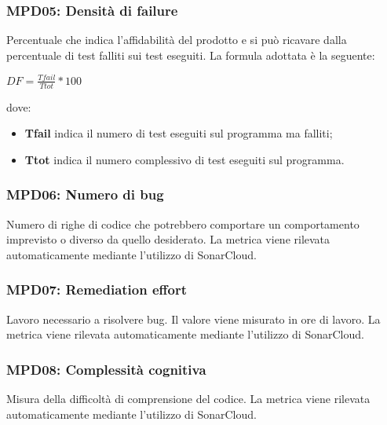 \subsubsection{MPD05: Densità di failure}
Percentuale che indica l'affidabilità del prodotto e si può ricavare dalla percentuale di test falliti sui test eseguiti.
La formula adottata è la seguente:
\begin{center}
    $DF = \displaystyle \frac{Tfail}{Ttot}*100$
\end{center}
dove:
\begin{itemize}
    \item \textbf{Tfail} indica il numero di test eseguiti sul programma ma falliti;
    \item \textbf{Ttot} indica il numero complessivo di test eseguiti sul programma.
\end{itemize}

\subsubsection{MPD06: Numero di bug}
Numero di righe di codice che potrebbero comportare un comportamento imprevisto o diverso da quello desiderato.
La metrica viene rilevata automaticamente mediante l’utilizzo di {SonarCloud}\glo.

\subsubsection{MPD07: Remediation effort}
Lavoro necessario a risolvere bug. Il valore viene misurato in ore di lavoro.
La metrica viene rilevata automaticamente mediante l’utilizzo di {SonarCloud}\glo.

\subsubsection{MPD08: Complessità cognitiva}
Misura della difficoltà di comprensione del codice.
La metrica viene rilevata automaticamente mediante l’utilizzo di {SonarCloud}\glo.

